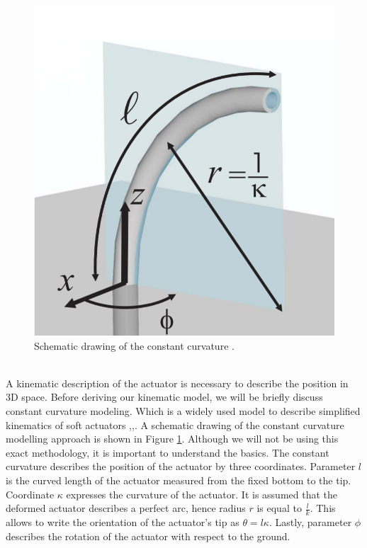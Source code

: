 \begin{minipage}{\linewidth}
\begin{minipage}{0.45\linewidth}
\begin{figure}[H]
              \includegraphics[width=\linewidth]{Figures/Chapter2/ccapproach.png}
              \caption{Schematic drawing of the constant curvature \cite{ccapproach}.}
              \label{fig2:ccapproach}
          \end{figure}
      \end{minipage}
  \end{minipage}

\\


A kinematic description of the actuator is necessary to describe the position in 3D space. Before deriving our kinematic model, we will be briefly discuss constant curvature modeling. Which is a widely used model to describe simplified kinematics of soft actuators \cite{ccapproach},\cite{berkers},\cite{Falkenhahn2015}. A schematic drawing of the constant curvature modelling approach is shown in Figure \ref{fig2:ccapproach}. Although we will not be using this exact methodology, it is important to understand the basics. The constant curvature describes the position of the actuator by three coordinates. Parameter $l$ is the curved length of the actuator measured from the fixed bottom to the tip. Coordinate $\kappa$ expresses the curvature of the actuator. It is assumed that the deformed actuator describes a perfect arc, hence radius $r$ is equal to $\frac{l}{k}$. This allows to write the orientation of the actuator's tip as $\theta = l\kappa$. Lastly, parameter $\phi$ describes the rotation of the actuator with respect to the ground. 

